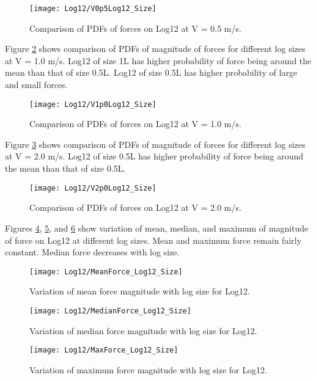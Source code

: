 \begin{figure}
\centering
\texttt{[image: Log12/V0p5Log12\_Size]}
\caption{\label{fig:V0p5Log12_Size}Comparison of PDFs of forces on Log12 at V = 0.5 m/s.}
\end{figure}

\noindent Figure \ref{fig:V1p0Log12_Size} shows comparison of PDFs of magnitude of forces for different log sizes at V = 1.0 m/s. Log12 of size 1L has higher probability of force being around the mean than that of size 0.5L. Log12 of size 0.5L has higher probability of large and small forces.

\begin{figure}
\centering
\texttt{[image: Log12/V1p0Log12\_Size]}
\caption{\label{fig:V1p0Log12_Size}Comparison of PDFs of forces on Log12 at V = 1.0 m/s.}
\end{figure}

\noindent Figure \ref{fig:V2p0Log12_Size} shows comparison of PDFs of magnitude of forces for different log sizes at V = 2.0 m/s. Log12 of size 0.5L has higher probability of force being around the mean than that of size 0.5L.

\begin{figure}
\centering
\texttt{[image: Log12/V2p0Log12\_Size]}
\caption{\label{fig:V2p0Log12_Size}Comparison of PDFs of forces on Log12 at V = 2.0 m/s.}
\end{figure}

\noindent Figures \ref{fig:MeanForce_Log12_Size}, \ref{fig:MedianForce_Log12_Size}, and \ref{fig:MaxForce_Log12_Size} show variation of mean, median, and maximum of magnitude of force on Log12 at different log sizes. Mean and maximum force remain fairly constant. Median force decreases with log size. 

\begin{figure}
\centering
\texttt{[image: Log12/MeanForce\_Log12\_Size]}
\caption{\label{fig:MeanForce_Log12_Size}Variation of mean force magnitude with log size for Log12.}
\end{figure}
\begin{figure}
\centering
\texttt{[image: Log12/MedianForce\_Log12\_Size]}
\caption{\label{fig:MedianForce_Log12_Size}Variation of median force magnitude with log size for Log12.}
\end{figure}
\begin{figure}
\centering
\texttt{[image: Log12/MaxForce\_Log12\_Size]}
\caption{\label{fig:MaxForce_Log12_Size}Variation of maximum force magnitude with log size for Log12.}
\end{figure}

